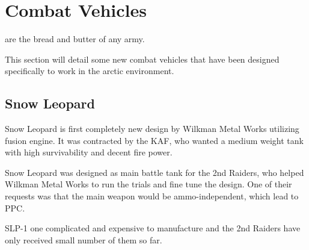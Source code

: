 \documentclass{tufte-book}
\begin{document}
\chapter{Combat Vehicles}
\label{ch:combat-vehicles}


 are the bread and butter of any army.

This section will detail some new combat vehicles that have been
designed specifically to work in the arctic environment.


\section{Snow Leopard}

 Snow Leopard is first completely new design
by Wilkman Metal Works utilizing fusion engine. It was contracted by the KAF,
who wanted a medium weight tank with high survivability and decent fire power.

Snow Leopard was designed as main battle tank for the 2nd Raiders, who helped
Wilkman Metal Works to run the trials and fine tune the design. One of their
requests was that the main weapon would be ammo-independent, which lead to
PPC.

SLP-1 one complicated and expensive to manufacture and the 2nd Raiders have
only received small number of them so far.
\end{document}
